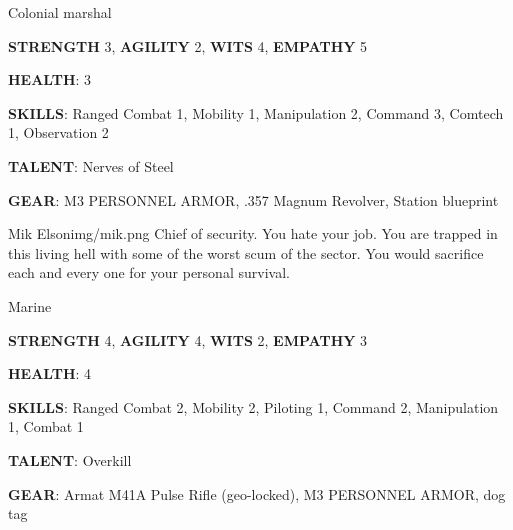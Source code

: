 \begin{rpg-commentbox}{}
    Colonial marshal

    \textbf{STRENGTH} 3, \textbf{AGILITY} 2, \textbf{WITS} 4, \textbf{EMPATHY} 5

    \textbf{HEALTH}: 3

    \textbf{SKILLS}: Ranged Combat 1, Mobility 1, Manipulation 2, Command 3, Comtech 1, Observation 2
    
    \textbf{TALENT}: Nerves of Steel
    
    \textbf{GEAR}: M3 PERSONNEL ARMOR, .357 Magnum Revolver, Station blueprint
\end{rpg-commentbox}


\newsect

\begin{rpg-pcbox}{Mik Elson}{img/mik.png}
    Chief of security. You hate your job. You are trapped in this living hell with some of the worst scum of the sector. You would sacrifice each and every one for your personal survival.
\end{rpg-pcbox}

\begin{rpg-commentbox}{}
    Marine

    \textbf{STRENGTH} 4, \textbf{AGILITY} 4, \textbf{WITS} 2, \textbf{EMPATHY} 3

    \textbf{HEALTH}: 4

    \textbf{SKILLS}: Ranged Combat 2, Mobility 2, Piloting 1, Command 2, Manipulation 1, Combat 1
    
    \textbf{TALENT}: Overkill
    
    \textbf{GEAR}: Armat M41A Pulse Rifle (geo-locked), M3 PERSONNEL ARMOR, dog tag
\end{rpg-commentbox}

\newsect

